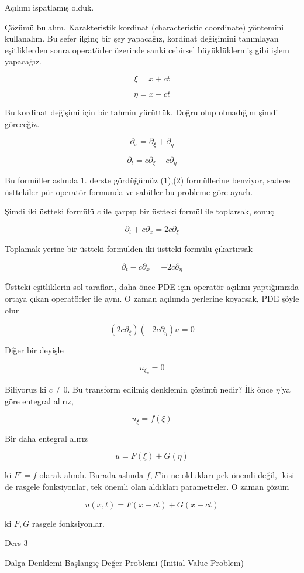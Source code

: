 \documentclass[12pt,fleqn]{article}\usepackage{../../common}
\begin{document}
Açılımı ispatlamış olduk. 

Çözümü bulalım. Karakteristik kordinat (characteristic coordinate)
yöntemini kullanalım. Bu sefer ilginç bir şey yapacağız, kordinat
değişimini tanımlayan eşitliklerden sonra operatörler üzerinde sanki
cebirsel büyüklüklermiş gibi işlem yapacağız. 

$$ \xi = x + ct $$

$$ \eta = x - ct $$

Bu kordinat değişimi için bir tahmin yürüttük. Doğru olup olmadığını şimdi
göreceğiz. 

$$ \partial_x = \partial_\xi + \partial_\eta $$

$$ \partial_t = c\partial_\xi - c \partial_\eta $$

Bu formüller aslında 1. derste gördüğümüz (1),(2) formüllerine benziyor,
sadece üsttekiler pür operatör formunda ve sabitler bu probleme göre
ayarlı. 

Şimdi iki üstteki formülü $c$ ile çarpıp bir üstteki formül ile toplarsak,
sonuç 

$$ \partial_t + c\partial_x = 2c \partial_\xi $$

Toplamak yerine bir üstteki formülden iki üstteki formülü çıkartırsak

$$ \partial_t - c\partial_x = -2c \partial_\eta $$

Üstteki eşitliklerin sol tarafları, daha önce PDE için operatör açılımı
yaptığımızda ortaya çıkan operatörler ile aynı. O zaman açılımda yerlerine
koyarsak, PDE şöyle olur

$$ (2c\partial_\xi)(-2c\partial_\eta)u = 0 $$

Diğer bir deyişle 

$$ u_{\xi_\eta} = 0 $$

Biliyoruz ki $c \ne 0$. Bu transform edilmiş denklemin çözümü nedir? İlk
önce $\eta$'ya göre entegral alırız, 

$$ u_\xi = f(\xi) $$

Bir daha entegral alırız

$$ u = F(\xi) + G(\eta) $$

ki $F' = f$ olarak alındı. Burada aslında $f,F$'in ne oldukları pek önemli
değil, ikisi de rasgele fonksiyonlar, tek önemli olan aldıkları
parametreler. O zaman çözüm 

$$ u(x,t) = F(x+ct) + G(x-ct) $$

ki $F,G$ rasgele fonksiyonlar. 

Ders 3

Dalga Denklemi Başlangıç Değer Problemi (Initial Value Problem) 
\end{document}
